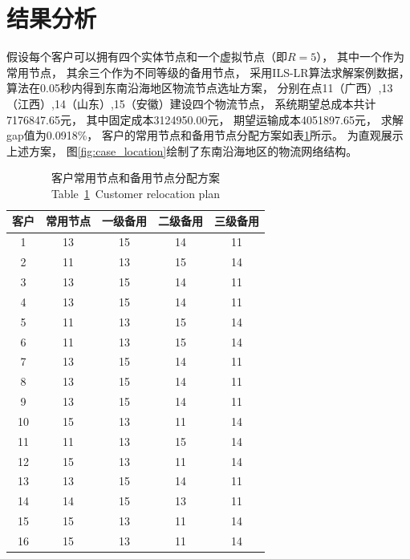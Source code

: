 \section{结果分析}
\label{sec:案例结果}
假设每个客户可以拥有四个实体节点和一个虚拟节点（即$R=5$），
其中一个作为常用节点，
其余三个作为不同等级的备用节点，
采用ILS-LR算法求解案例数据，
算法在0.05秒内得到东南沿海地区物流节点选址方案，
分别在点11（广西）,13（江西）,14（山东）,15（安徽）建设四个物流节点，
系统期望总成本共计7176847.65元，
其中固定成本3124950.00元，
期望运输成本4051897.65元，
求解gap值为0.0918\%，
客户的常用节点和备用节点分配方案如表\ref{table:分配方案}所示。
为直观展示上述方案，
图\ref{fig:case_location}绘制了东南沿海地区的物流网络结构。

\begin{table}[hbt]
    \setlength{\abovecaptionskip}{-0.05cm} %
    \setlength{\belowcaptionskip}{-0.2cm} 
    \centering
    \renewcommand\arraystretch{0.8}
    \caption{客户常用节点和备用节点分配方案\\Table~\ref{table:分配方案}~Customer relocation plan}
    \small{
        \begin{tabular}{ccccc}
            \toprule %
            客户    & 常用节点  & 一级备用 & 二级备用 & 三级备用 \\
            \midrule %
            1     & 13    & 15    & 14    & 11 \\
            2     & 11    & 13    & 15    & 14 \\
            3     & 13    & 15    & 14    & 11 \\
            4     & 13    & 15    & 14    & 11 \\
            5     & 11    & 13    & 15    & 14 \\
            6     & 11    & 13    & 15    & 14 \\
            7     & 13    & 15    & 14    & 11 \\
            8     & 13    & 15    & 14    & 11 \\
            9     & 13    & 15    & 14    & 11 \\
            10    & 15    & 13    & 11    & 14 \\
            11    & 11    & 13    & 15    & 14 \\
            12    & 15    & 13    & 11    & 14 \\
            13    & 13    & 15    & 14    & 11 \\
            14    & 14    & 15    & 13    & 11 \\
            15    & 15    & 13    & 11    & 14 \\
            16    & 15    & 13    & 11    & 14 \\
            \bottomrule %
        \end{tabular}%
    }
    \label{table:分配方案}
\end{table}%

